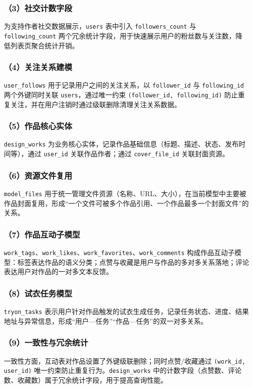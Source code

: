 \documentclass[twoside]{thesis-cls-Miya} %
\begin{document}
\subsubsection*{（3）社交计数字段}
为支持作者社交数据展示，\texttt{users} 表中引入 \texttt{followers\_count} 与 \texttt{following\_count} 两个冗余统计字段，用于快速展示用户的粉丝数与关注数，降低列表页聚合统计开销。

\subsubsection*{（4）关注关系建模}
\texttt{user\_follows} 用于记录用户之间的关注关系，以 \texttt{follower\_id} 与 \texttt{following\_id} 两个外键同时关联 \texttt{users}，通过唯一约束 \texttt{(follower\_id, following\_id)} 防止重复关注，并在用户注销时通过级联删除清理关注关系数据。

\subsubsection*{（5）作品核心实体}
\texttt{design\_works} 为业务核心实体，记录作品基础信息（标题、描述、状态、发布时间等），通过 \texttt{user\_id} 关联作品作者；通过 \texttt{cover\_file\_id} 关联封面资源。

\subsubsection*{（6）资源文件复用}
\texttt{model\_files} 用于统一管理文件资源（名称、URL、大小），在当前模型中主要被作品封面复用，形成“一个文件可被多个作品引用、一个作品最多一个封面文件”的关系。

\subsubsection*{（7）作品互动子模型}
\texttt{work\_tags}、\texttt{work\_likes}、\texttt{work\_favorites}、\texttt{work\_comments} 构成作品互动子模型：标签表达作品的语义分类；点赞与收藏是用户与作品的多对多关系落地；评论表达用户对作品的一对多文本反馈。

\subsubsection*{（8）试衣任务模型}
\texttt{tryon\_tasks} 表示用户针对作品触发的试衣生成任务，记录任务状态、进度、结果地址与异常信息，形成“用户—任务”“作品—任务”的双一对多关系。

\subsubsection*{（9）一致性与冗余统计}
一致性方面，互动表对作品设置了外键级联删除；同时点赞/收藏通过 \texttt{(work\_id, user\_id)} 唯一约束防止重复行为。\texttt{design\_works} 中的计数字段（点赞数、评论数、收藏数）属于冗余统计字段，用于提高查询性能。
\end{document}

